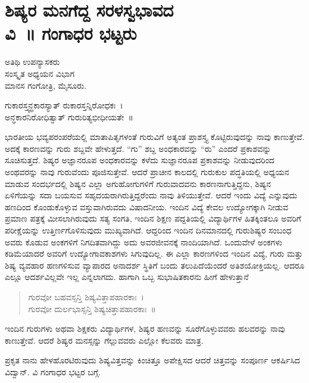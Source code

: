 {\fontsize{14}{16}\selectfont
\chapter[ಶಿಷ್ಯರ ಮನಗೆದ್ದ ಸರಳಸ್ವಭಾವದ ವಿ~॥ ಗಂಗಾಧರ ಭಟ್ಟರು]{ಶಿಷ್ಯರ ಮನಗೆದ್ದ ಸರಳಸ್ವಭಾವದ \\ವಿ~॥ ಗಂಗಾಧರ ಭಟ್ಟರು}

\begin{center}
\smallskip
ಅತಿಥಿ ಉಪನ್ಯಾಸಕರು\\
ಸಂಸ್ಕೃತ ಅಧ್ಯಯನ ವಿಭಾಗ\\
ಮಾನಸ ಗಂಗೋತ್ರಿ, ಮೈಸೂರು.
\addrule
\end{center}
\begin{center}
ಗುಕಾರಸ್ತ್ವನ್ಧಕಾರಸ್ಯಾತ್ ರುಕಾರಸ್ತನ್ನಿರೋಧಕಃ~।\\
ಅನ್ಧಕಾರನಿರೋಧಿತ್ವಾತ್ ಗುರುರಿತ್ಯಭೀಧೀಯತೇ~॥
\end{center}
ಭಾರತೀಯ ಭವ್ಯಪರಂಪರೆಯಲ್ಲಿ ಮಾತಾಪಿತೃಗಳಂತೆ ಗುರುವಿಗೆ ಅತ್ಯಂತ ಪ್ರಾಶಸ್ತ್ಯ ಕೊಟ್ಟಿರುವುದನ್ನು ನಾವು ಕಾಣುತ್ತೇವೆ. ಅದಕ್ಕೆ ಕಾರಣವನ್ನು ಗುರು ಶಬ್ದವೇ ಹೇಳುತ್ತದೆ. “ಗು” ಶಬ್ದ ಅಂಧಕಾರವನ್ನು “ರು” ಎಂದರೆ ಪ್ರಕಾಶವನ್ನು ಸೂಚಿಸುತ್ತದೆ. ಶಿಷ್ಯರ ಅಜ್ಞಾನರೂಪ ಅಂಧಕಾರವನ್ನು ಕಳೆದು ಸುಜ್ಞಾನರೂಪ ಪ್ರಕಾಶವನ್ನು ನೀಡುವುದರಿಂದ ಅಂಥವರನ್ನು ನಾವು ಗುರುವೆಂದು ಪೂಜಿಸುತ್ತೇವೆ. ಆದರೆ ಪ್ರಾಚೀನ ಕಾಲದಲ್ಲಿ ಗುರುಕುಲ ಪದ್ಧತಿ\-ಯಲ್ಲಿ ಅಧ್ಯಯನ ಮಾಡುವ ಸಂದರ್ಭದಲ್ಲಿ ಶಿಷ್ಯನ ಎಲ್ಲಾ ಅಗು\-ಹೋಗು\-ಗಳಿಗೆ ಗುರುವಾದವನು ಕಾರಣನಾಗುತ್ತಿದ್ದನು, ಶಿಷ್ಯನ ಏಳಿಗೆಯನ್ನು ಸದಾ ಬಯಸುವ ಸಹೃದಯರಾಗಿರುತ್ತಿದ್ದರೆಂದು ನಾವು ತಿಳಿಯುತ್ತೇವೆ. ಆದರೆ ಇಂದು ವಿದ್ಯೆ ಎನ್ನುವುದು ಹಣದಿಂದ ಕೊಂಡುಕೊಳ್ಳುವ ವಸ್ತುವಾಗಿರುವದು ವಿಷಾದನೀಯ. ಇಂದಿನ ವಿದ್ಯೆ ಕೇವಲ ಉದ್ಯೋಗಕ್ಕಾಗಿ ನೀಡುವ ಪ್ರಮಾಣ ಪತ್ರಕ್ಕೆ ಮೀಸಲಾಗಿರುವುದು ಸತ್ಯ ಸಂಗತಿ, ಇಂದಿನ ಶಿಕ್ಷಣ ಪದ್ದತಿಯಲ್ಲಿ ವಿದ್ಯಾರ್ಥಿಗಳ ಹಿತಕ್ಕಿಂತಲೂ ಅವರಿಗೆ ಪರೀಕ್ಷೆಯನ್ನು ಉತ್ತಿರ್ಣಗೊಳಿಸುವುದು ಮುಖ್ಯವಾಗಿದೆ. ಆದ್ದರಿಂದ ಇಂದಿನ ದಿನಮಾನದಲ್ಲಿ ಗುರುಶಿಷ್ಯರ ಸಂಬಂಧ ಅವರು ಕೊಡುವ ಅಂಕಗಳಿಗೆ ನಿಗದಿತವಾಗಿದ್ದು ಅದು ಅವರ\break ಜೀವನಕ್ಕೆ ನಾಂದಿಯಾಗಿದೆ. ಒಂದುವೇಳೆ ಅಂಕಗಳು ಕಡಿಮೆಯಾದರೆ ಅವರಿಗೆ ಉದ್ಯೋಗಾವಕಾಶಗಳು ಸಿಗುವುದಿಲ್ಲ. ಈ ಎಲ್ಲಾ ಕಾರಣಗಳಿಂದ ಇಂದಿನ ವಿದ್ಯೆ, ಗುರು ಮತ್ತು ಶಿಷ್ಯ ವ್ಯವಹಾರ ಹಣಗಳಿಸುವ ವ್ಯಾಪಾರದ ಅನಾದರ್ಶ ಸ್ಥಿತಿಗೆ ಬಂದು ತಲುಪಿದೆಯೆಂದರೆ ಅತಿಶಯೋಕ್ತಿಯಲ್ಲ. ಆದರೂ ಎಲ್ಲೂ ಆದರ್ಶವಿಲ್ಲವೇ ಇಲ್ಲ ಎನ್ನಲಾಗದು. ಹಾಗಾಗಿ ಒಬ್ಬ ಸುಭಾಷಿತಕಾರನು ಹೀಗೆ ಹೇಳುತ್ತಾನೆ 
\begin{verse}
ಗುರವೋ ಬಹವಸ್ಸನ್ತಿ ಶಿಷ್ಯವಿತ್ತಾಪಹಾರಕಾಃ~।\\
ಗುರವೋ ದುರ್ಲಭಾಸ್ಸನ್ತಿ ಶಿಷ್ಯಚಿತ್ತಾಪಹಾರಕಾಃ~॥
\end{verse}
ಇಂದಿನ ಗುರುಗಳು ಅಥವಾ ಶಿಕ್ಷಕರು ವಿದ್ಯಾರ್ಥಿಗಳ, ಶಿಷ್ಯರ ಹಣವನ್ನು ಸೂರೆ\-ಗೊಳ್ಳುವವರು ಹಲವರನ್ನು ನಾವು ಕಾಣುತ್ತೇವೆ. ಆದರೆ ಶಿಷ್ಯರ ಮನಸ್ಸನ್ನು ಗೆಲ್ಲುವವರು ಎಲ್ಲೋ ಕೆಲವರು ಮಾತ್ರ.

ಪ್ರಕೃತ ನಾನು ಹೇಳಹೊರಟಿರುವುದು ಶಿಷ್ಯವಿತ್ತವನ್ನು ಕಿಂಚಿತ್ತೂ ಅಪೇಕ್ಷಿಸದ ಆದರೆ ಚಿತ್ತವನ್ನು ಸಂಪೂರ್ಣ ಆಕರ್ಷಿಸಿದ ವಿದ್ವಾನ್. ವಿ ಗಂಗಾಧರ ಭಟ್ಟರ ಬಗ್ಗೆ.

}
